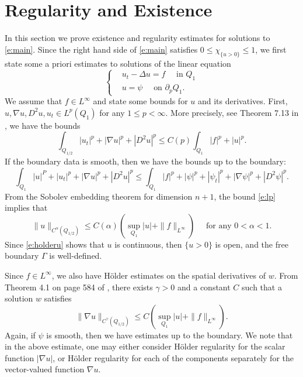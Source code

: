 \documentclass{amsart}
\numberwithin{equation}{section}
\begin{document}
\section{Regularity and Existence} \label{s:er}
In this section we prove existence and regularity estimates for solutions to \eqref{e:main}. Since the right hand side of \eqref{e:main} satisfies 
$0 \leq \chi_{\{u>0\}} \leq 1$, we first state some a priori estimates to solutions of the linear equation 
\begin{equation} \label{e:w}
 \begin{cases}
   &u_t - \Delta u = f \quad \text{ in } Q_1 \\
   &u=\psi \quad \text{ on } \partial_p Q_1.
 \end{cases}
 \end{equation}
 We assume that $f\in L^{\infty}$ and state some bounds for $u$ and its derivatives. First, $u,\nabla u, D^2 u, u_t \in L^p(Q_1)$ for any $1\leq p<\infty$. More precisely, see Theorem 7.13 in \cite{l96}, we have the bounds
 \begin{equation} \label{e:lp}
  \int_{Q_{1/2}} |u_t|^p + |\nabla u|^p+ |D^2 u|^p \leq C(p) \int_{Q_1} |f|^p + |u|^p.
 \end{equation}
 If the boundary data is smooth, then we have the bounds up to the boundary:
\[
 \int_{Q_{1}} |u|^P + |u_t|^p + |\nabla u|^p+ |D^2 u|^p 
 \leq \int_{Q_{1}}|f|^p+ |\psi|^p + |\psi_t|^p + |\nabla \psi |^p+ |D^2 \psi|^p.  
\]
From the Sobolev embedding theorem for dimension $n+1$, the bound \eqref{e:lp} implies that 
\begin{equation} \label{e:holderu}
 \| u \|_{C^{\alpha}(Q_{1/2})}
 \leq C(\alpha) ( \sup_{Q_1} |u| +\| f \|_{L^{\infty}}) \quad \text{ for any } 0< \alpha < 1. 
\end{equation}
Since \eqref{e:holderu} shows that $u$ is continuous, then $\{u>0\}$ is open, and the free boundary $\Gamma$ is well-defined. 

Since $f \in L^{\infty}$, we also have H\"older estimates on the spatial derivatives of $w$. From Theorem 4.1 on page 584 of \cite{l68}, there exists $\gamma>0$ and a constant $C$ such that a solution $w$ satisfies
\begin{equation} \label{e:holdergrad}
 \|\nabla u\|_{C^{\gamma}(Q_{1/2})} \leq C (\sup_{Q_1} |u| + \| f\|_{L^{\infty}}). 
\end{equation}
Again, if $\psi$ is smooth, then we have estimates up to the boundary. We note that in the above estimate, one may either consider H\"older regularity for the  scalar function $|\nabla u|$, or H\"older regularity for each of the components separately for the vector-valued function $\nabla u$. 
\end{document}
